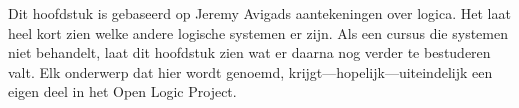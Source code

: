 \documentclass[../../../include/open-logic-chapter]{subfiles}
\begin{document}

\begin{editorial}
  Dit hoofdstuk is gebaseerd op Jeremy Avigads aantekeningen over
  logica. Het laat heel kort zien welke andere logische systemen er
  zijn. Als een cursus die systemen niet behandelt, laat dit hoofdstuk
  zien wat er daarna nog verder te bestuderen valt. Elk onderwerp dat
  hier wordt genoemd, krijgt---hopelijk---uiteindelijk een eigen deel
  in het Open Logic Project.
\end{editorial}








\OLEndChapterHook
\end{document}
